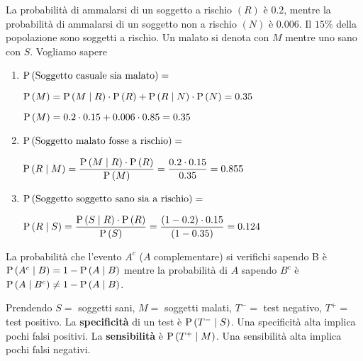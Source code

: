 \begin{exrc}
	La probabilità di ammalarsi di un soggetto a rischio $ (R) $ è $ 0.2 $, mentre la probabilità di ammalarsi di un soggetto non a rischio $ (N) $ è $ 0.006 $. Il $ 15\% $ della popolazione sono soggetti a rischio. Un malato si denota con $ M $ mentre uno sano con $ S $. Vogliamo sapere 
	
	\begin{enumerate}
		\item $ \text{P}\left(\text{Soggetto casuale sia malato}\right) = $
		
		$ \text{P}\left(M\right) = \text{P}\left(M \mid R\right) \cdot \text{P}\left(R\right) + \text{P}\left(R \mid N\right) \cdot \text{P}\left(N\right) = 0.35 $ 
		
		$ \text{P}\left(M\right) = 0.2 \cdot 0.15 + 0.006 \cdot 0.85 = 0.35 $
		
		\item $ \text{P}\left(\text{Soggetto malato fosse a rischio}\right) = $
		
		$ \text{P}\left(R \mid M\right) = \dfrac{\text{P}\left(M \mid R\right) \cdot \text{P}\left(R\right)}{\text{P}\left(M\right)} = \dfrac{0.2 \cdot 0.15}{0.35} = 0.855 $
		
		\item $ \text{P}\left(\text{Soggetto soggetto sano sia a rischio}\right) = $
		
		$ \text{P}\left(R \mid S\right) = \dfrac{\text{P}\left(S \mid R\right) \cdot \text{P}\left(R\right)}{\text{P}\left(S\right)} = \dfrac{(1-0.2) \cdot 0.15}{(1-0.35)} = 0.124$
	\end{enumerate}
	
	\begin{note}
		La probabilità che l'evento $ A^c $ ($ A $ complementare) si verifichi sapendo B è $ \text{P}\left(A^c \mid B\right) = 1 - \text{P}\left(A \mid B\right) $ 
		mentre la probabilità di $ A $ sapendo $ B^c $ è $ \text{P}\left(A \mid B^c\right) \neq 1 - \text{P}\left(A \mid B\right) $.
	\end{note}

	\begin{defn}
		Prendendo $ S = $ soggetti sani, $ M = $ soggetti malati, $ T^- = $ test negativo, $ T^+ = $ test positivo. 
		La \textbf{specificità} di un test è $ \text{P}\left(T^- \mid S\right) $. Una specificità alta implica pochi falsi positivi. 
		La \textbf{sensibilità} è $ \text{P}\left(T^+ \mid M\right) $. Una sensibilità alta implica pochi falsi negativi.
	\end{defn}
\end{exrc}


